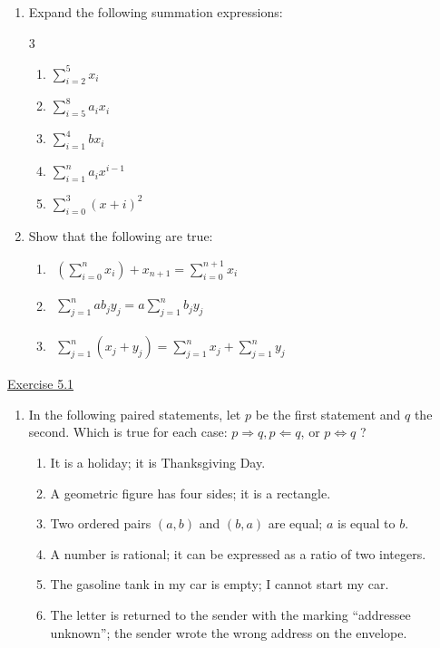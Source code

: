 \begin{enumerate}
\item[6.]  Expand the following summation expressions:
\begin{multicols}{3}
\begin{enumerate}\renewcommand{\labelenumi}{\alph{enumi})}
\item [(a)] $\sum_{i=2}^5 x_i$
\item [(b)] $\sum_{i=5}^8 a_i x_i$
\item [(c)] $\sum_{i=1}^4 b x_i$
\item [(d)] $\sum_{i=1}^n a_i x^{i-1}$
\item [(e)] $\sum_{i=0}^3(x+i)^2$ \\
\end{enumerate}
\end{multicols}

\item[8.] Show that the following are true:
\begin{enumerate}
\item[(a)] $\begin{aligned} \left(\sum_{i=0}^n x_i\right)+x_{n+1}=\sum_{i=0}^{n+1} x_i \end{aligned}$
\item[(b)] $\begin{aligned}\sum_{j=1}^n a b_j y_j=a \sum_{j=1}^n b_j y_j\end{aligned}$
\item[(c)] $\begin{aligned}\sum_{j=1}^n\left(x_j+y_j\right)=\sum_{j=1}^n x_j+\sum_{j=1}^n y_j\end{aligned}$ \\
\end{enumerate}
\end{enumerate}



\underline{Exercise 5.1}
\begin{enumerate}
\item[1.] In the following paired statements, let $p$ be the first statement and $q$ the second. Which is true for each case: $p \Rightarrow q, p \Leftarrow q$, or $p \Leftrightarrow q$ ?
\begin{enumerate}
\item It is a holiday; it is Thanksgiving Day.
\item A geometric figure has four sides; it is a rectangle.
\item Two ordered pairs $(a, b)$ and $(b, a)$ are equal; $a$ is equal to $b$.
\item A number is rational; it can be expressed as a ratio of two integers.
\item The gasoline tank in my car is empty; I cannot start my car.
\item The letter is returned to the sender with the marking ``addressee unknown''; the sender wrote the wrong address on the envelope.\end{enumerate}
\end{enumerate}
